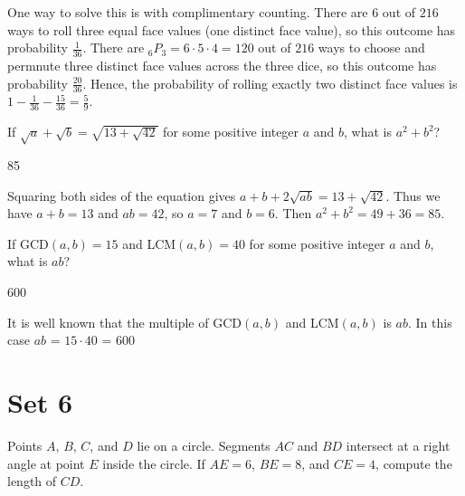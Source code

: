 \documentclass[11pt]{article}
\begin{document}
\begin{solution}
One way to solve this is with complimentary counting. There are $6$ out of $216$ ways to roll three equal face values (one distinct face value), so this outcome has probability $\frac{1}{36}$. There are $_6P_3 = 6 \cdot 5 \cdot 4 = 120$ out of $216$ ways to choose and permnute three distinct face values across the three dice, so this outcome has probability $\frac{20}{36}$. Hence, the probability of rolling exactly two distinct face values is $1 - \frac{1}{36} - \frac{15}{36} = \frac{5}{9}$.
\end{solution}


\begin{problem}%
If $\sqrt{a}+\sqrt{b} = \sqrt{13+\sqrt{42}}$ for some positive integer $a$ and $b$, what is $a^2+b^2$?
\end{problem}

\begin{answer}
85
\end{answer}

\begin{solution}
Squaring both sides of the equation gives $a + b + 2\sqrt{ab} = 13 + \sqrt{42}$. Thus we have $a+b = 13$ and $ab = 42$, so $a = 7$ and $b = 6$. Then $a^2 + b^2 = 49 + 36 = 85$.
\end{solution}

\begin{problem}
If GCD$(a, b) = 15$ and LCM$(a, b) = 40$ for some positive integer $a$ and $b$, what is $ab$?
\end{problem}

\begin{answer}
600
\end{answer}

\begin{solution}
It is well known that the multiple of GCD$(a, b)$ and LCM$(a, b)$ is $ab$. In this case $ab$ = $15 \cdot 40$ = 600
\end{solution}

\newpage

\section*{Set 6}

\begin{problem}
Points $A$, $B$, $C$, and $D$ lie on a circle. Segments $AC$ and $BD$ intersect at a right angle at point $E$ inside the circle. If $AE = 6$, $BE = 8$, and $CE = 4$, compute the length of $CD$.
\end{problem}
\end{document}
